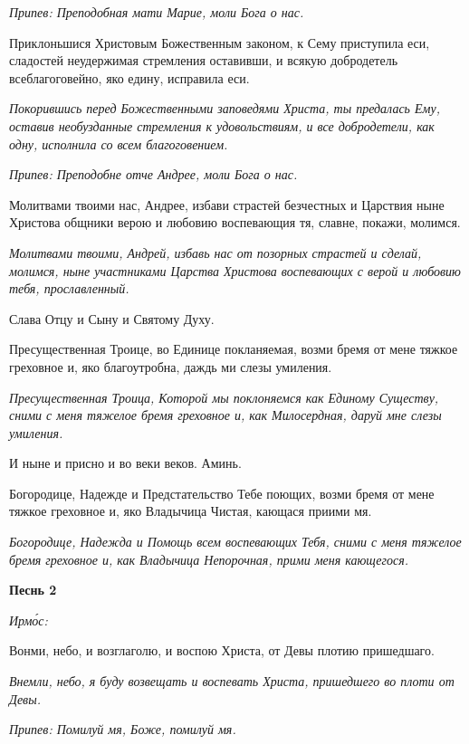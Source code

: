 \itshape Припев:\normalfont{} Преподобная мати Марие, моли Бога о нас.


Приклоньшися Христовым Божественным законом, к Сему приступила еси, сладостей неудержимая стремления оставивши, и всякую добродетель всеблагоговейно, яко едину, исправила еси.


\itshape Покорившись перед Божественными заповедями Христа, ты предалась Ему, оставив необузданные стремления к удовольствиям, и все добродетели, как одну, исполнила со всем благоговением.\normalfont{}


\itshape Припев:\normalfont{} Преподобне отче Андрее, моли Бога о нас.


Молитвами твоими нас, Андрее, избави страстей безчестных и Царствия ныне Христова общники верою и любовию воспевающия тя, славне, покажи, молимся.


\itshape Молитвами твоими, Андрей, избавь нас от позорных страстей и сделай, молимся, ныне участниками Царства Христова воспевающих с верой и любовию тебя, прославленный.\normalfont{}


Слава Отцу и Сыну и Святому Духу.


Пресущественная Троице, во Единице покланяемая, возми бремя от мене тяжкое греховное и, яко благоутробна, даждь ми слезы умиления.


\itshape Пресущественная Троица, Которой мы поклоняемся как Единому Существу, сними с меня тяжелое бремя греховное и, как Милосердная, даруй мне слезы умиления.\normalfont{}


И ныне и присно и во веки веков. Аминь.


Богородице, Надежде и Предстательство Тебе поющих, возми бремя от мене тяжкое греховное и, яко Владычица Чистая, кающася приими мя.


\itshape Богородице, Надежда и Помощь всем воспевающих Тебя, сними с меня тяжелое бремя греховное и, как Владычица Непорочная, прими меня кающегося.\normalfont{}





\bfseries Песнь 2\normalfont{}


\itshape Ирмо́с:\normalfont{}


Вонми, небо, и возглаголю, и воспою Христа, от Девы плотию пришедшаго.


\itshape Внемли, небо, я буду возвещать и воспевать Христа, пришедшего во плоти от Девы.\normalfont{}


\itshape Припев:\normalfont{} Помилуй мя, Боже, помилуй мя.


